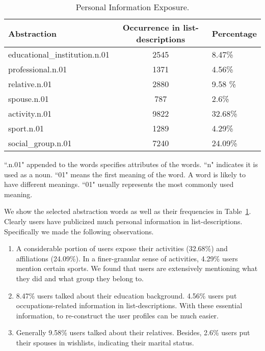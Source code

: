 \begin{table}[t]
\centering
\caption{Personal Information Exposure.}
\label{tb:abstract}
\begin{adjustbox}{max width=.5\textwidth}
\begin{threeparttable}
\begin{tabular}{lcl}
Abstraction & Occurrence in list-descriptions & Percentage \\ \hline
educational\_institution.n.01 & 2545 & 8.47\%	\\
professional.n.01 & 1371 & 4.56\%		\\
relative.n.01 & 2880 & 9.58 \%		\\
spouse.n.01 & 787 & 2.6\%	\\
activity.n.01 & 9822 & 32.68\%	\\
sport.n.01 & 1289 & 4.29\%	\\
social\_group.n.01 & 7240 & 24.09\% 
\end{tabular}
\begin{tablenotes}
      \small
      \item ``.n.01" appended to the words specifies attributes of the words. ``n" indicates it is used as a noun. ``01" means the first meaning of the word. A word is likely to have different meanings. ``01" usually represents the most commonly used meaning.
    \end{tablenotes}
  \end{threeparttable}
\end{adjustbox}
\end{table}

We show the selected abstraction words as well as their frequencies in Table~\ref{tb:abstract}. Clearly users have publicized much personal information in list-descriptions. Specifically we made the following observations. 

\begin{enumerate}[leftmargin=*]
\item A considerable portion of users expose their activities (32.68\%) and affiliations (24.09\%). In a finer-granular sense of activities, 4.29\% users mention certain sports. We found that users are extensively mentioning what they did and what group they belong to. 
\item 8.47\% users talked about their education background. 4.56\% users put occupations-related information in list-descriptions. With these essential information, to re-construct the user profiles can be much easier. 
\item Generally 9.58\% users talked about their relatives. Besides, 2.6\% users put their spouses in wishlists, indicating their marital status.
\end{enumerate}

